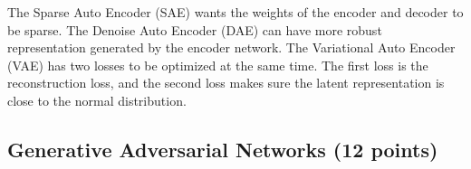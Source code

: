 \begin{questions}
    \begin{checkboxes}
        \choice The Sparse Auto Encoder (SAE) wants the weights of the encoder and decoder to be sparse.
        \choice The Denoise Auto Encoder (DAE) can have more robust representation generated by the encoder network.
        \choice The Variational Auto Encoder (VAE) has two losses to be optimized at the same time. The first loss is the reconstruction loss, and the second loss makes sure the latent representation is close to the normal distribution.
    \end{checkboxes}

\end{questions}

\clearpage
\subsection{Generative Adversarial Networks (12 points)} 
